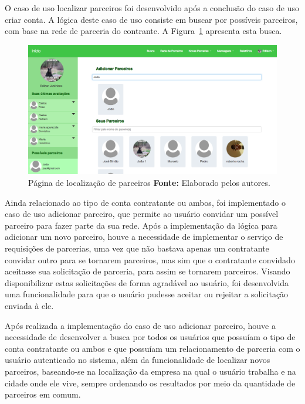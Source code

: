 \par O caso de uso localizar parceiros foi desenvolvido após a conclusão do caso de uso criar conta. A lógica deste caso de uso consiste em buscar por possíveis parceiros, com base na rede de parceria do contrante. A Figura~\ref{fig:pagina_localizar_parceiro} apresenta esta busca.

\begin{figure}[h!]
	\centerline{\includegraphics[scale=0.3]{./imagens/localizar-parceiro.png}}
	\caption[Página de localização de parceiros]
	{Página de localização de parceiros \textbf{Fonte:} Elaborado pelos autores.}
	\label{fig:pagina_localizar_parceiro}
\end{figure}

\par Ainda relacionado ao tipo de conta contratante ou ambos, foi implementado o caso de uso adicionar parceiro, que permite ao usuário convidar um possível parceiro para fazer parte da sua rede. Após a implementação da lógica para adicionar um novo parceiro, houve a necessidade de implementar o serviço de requisições de parcerias, uma vez que não bastava apenas um contratante convidar outro para se tornarem parceiros, mas sim que o contratante convidado aceitasse sua solicitação de parceria, para assim se tornarem parceiros. Visando disponibilizar estas solicitações de forma agradável ao usuário, foi desenvolvida uma funcionalidade para que o usuário pudesse aceitar ou rejeitar a solicitação enviada à ele.

\par Após realizada a implementação do caso de uso adicionar parceiro, houve a necessidade de desenvolver a busca por todos os usuários que possuíam o tipo de conta contratante ou ambos e que possuíam um relacionamento de parceria com o usuário autenticado no sistema, além da funcionalidade de localizar novos parceiros, baseando-se na localização da empresa na qual o usuário trabalha e na cidade onde ele vive, sempre ordenando os resultados por meio da quantidade de parceiros em comum. 


